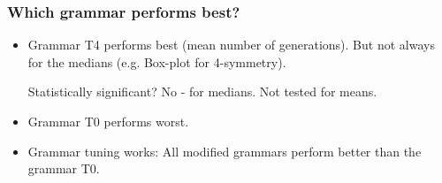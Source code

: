 \begin{frame}
\frametitle{
Which grammar performs best?
}
\begin{itemize}
\item Grammar T4 performs best (mean number of generations).
  But not always for the medians (e.g. Box-plot for 4-symmetry).
 
Statistically significant? No - for medians. Not tested for means.
\item Grammar T0 performs worst.
\item Grammar tuning works:
 All modified grammars perform better than the grammar T0.
\end{itemize}
\end{frame}
